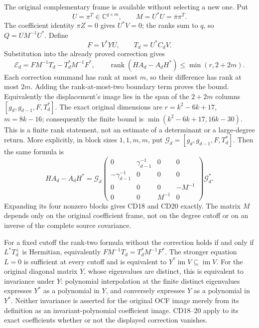 \documentclass[11pt]{article}
\newcommand{\C}{\mathbb C}
\begin{document}
The original complementary frame is available without selecting a new
one. Put
\[
 U=\pi^T\in\C^{q\times m},\qquad M=U^*U=\overline\pi\pi^T.
\]
The coefficient identity \(\pi Z=0\) gives \(U^*V=0\); the ranks
sum to \(q\), so \(Q=UM^{-1}U^*\). Define
\[
 F=V^*YU,\qquad T_d=U^*C_dV.
\]
Substitution into the already proved correction gives
\begin{equation}\label{eq:actual-complement}
 \boxed{\mathcal E_d=FM^{-1}T_d-T_d^*M^{-1}F^*,
 \qquad
 \operatorname{rank}(HA_d-A_dH^*)\leq\min(r,2+2m).}
 \tag{CD20}
\end{equation}
Each correction summand has rank at most \(m\), so their difference
has rank at most \(2m\). Adding the rank-at-most-two boundary term
proves the bound. Equivalently the displacement's image lies in the
span of the \(2+2m\) columns
\([g_d,g_{d-1},F,T_d^*]\). The exact original dimensions are
\(r=k^2-6k+17\), \(m=8k-16\); consequently the finite bound is
\(\min(k^2-6k+17,16k-30)\). This is a finite rank statement, not an
estimate of a determinant or a large-degree return.
More explicitly, in block sizes \(1,1,m,m\), put
\(\mathcal G_d=[g_d,g_{d-1},F,T_d^*]\). Then the same formula is
\[
 HA_d-A_dH^*=\mathcal G_d
 \begin{pmatrix}
 0&\gamma_{d-1}^{-1}&0&0\\
 -\gamma_{d-1}^{-1}&0&0&0\\
 0&0&0&-M^{-1}\\
 0&0&M^{-1}&0
 \end{pmatrix}\mathcal G_d^*.
\]
Expanding its four nonzero blocks gives CD18 and CD20 exactly. The
matrix \(M\) depends only on the original coefficient frame, not on
the degree cutoff or on an inverse of the complete source covariance.

For a fixed cutoff the rank-two formula without the correction holds
if and only if \(L^*T_d^\perp\) is Hermitian, equivalently
\(FM^{-1}T_d=T_d^*M^{-1}F^*\). The stronger equation \(L=0\) is
sufficient at every cutoff and is equivalent to
\(Y^*\operatorname{im}V\subseteq\operatorname{im}V\).
For the original diagonal matrix \(Y\), whose eigenvalues are distinct,
this is equivalent to invariance under \(Y\): polynomial interpolation
at the finite distinct eigenvalues expresses \(Y^*\) as a polynomial
in \(Y\), and conversely expresses \(Y\) as a polynomial in \(Y^*\).
Neither invariance is asserted for the original OCF image merely from
its definition as an invariant-polynomial coefficient image. CD18--20
apply to its exact coefficients whether or not the displayed correction
vanishes.
\end{document}
